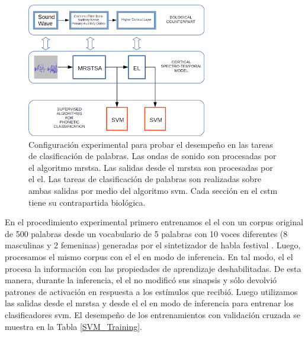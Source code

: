 
\begin{figure}[h!]
    \centering
    \includegraphics[width=0.7\textwidth]{Experiment.png}
    \caption{Configuración experimental para probar el desempeño en las tareas de clasificación de palabras. Las ondas de sonido son procesadas por el algoritmo \gls{mrstsa}. Las salidas desde el \gls{mrstsa} son procesadas por el \gls{el}. Las tareas de clasificación de palabras son realizadas sobre ambas salidas por medio del algoritmo \gls{svm}. Cada sección en el \gls{cstm} tiene su contrapartida biológica.}
    \label{fig:Experiment}
\end{figure}

\pagebreak

En el procedimiento experimental primero entrenamos el \gls{el} con un corpus original de 500 palabras desde un vocabulario de 5 palabras con 10 voces diferentes (8 masculinas y 2 femeninas) generadas por el sintetizador de habla \gls{festival} \cite{festival2014}. Luego, procesamos el mismo corpus con el \gls{el} en modo de inferencia. En tal modo, el \gls{el} procesa la información con las propiedades de aprendizaje deshabilitadas. De esta manera, durante la inferencia, el \gls{el} no modificó sus sinapsis y sólo devolvió patrones de activación en respuesta a los estímulos que recibió. Luego utilizamos las salidas desde el \gls{mrstsa} y desde el \gls{el} en modo de inferencia para entrenar los clasificadores \gls{svm}. El desempeño de los entrenamientos con validación cruzada se muestra en la Tabla \ref{SVM_Training}.


